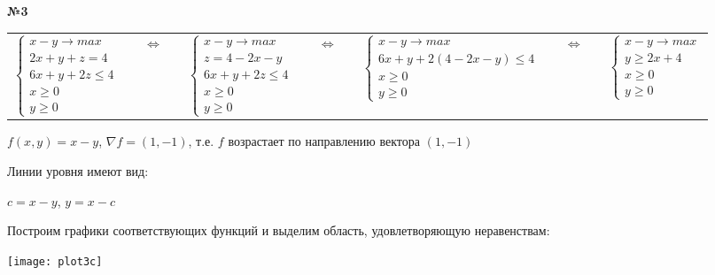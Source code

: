 \documentclass{article}
\newenvironment{task}{\begin{center}\fontsize{14}{14}\selectfont\bf}{\rm\fontsize{12}{12}\selectfont\end{center}}
\begin{document}

	\begin{task} 
		№3
	\end{task}
	\begin{center}
		\begin{tabular}{ccccccc}
			$ \begin{cases}
			x-y \rightarrow max \\
			2x+y+z=4 \\
			6x+y+2z \leq 4 \\
			x \geq 0 \\
			y \geq 0
			\end{cases} $
			& $\quad \Leftrightarrow \quad$ &
			$ \begin{cases}
			x-y \rightarrow max \\
			z=4-2x-y \\
			6x+y+2z \leq 4 \\
			x \geq 0 \\
			y \geq 0 
			\end{cases} $
			& $\quad \Leftrightarrow \quad$ &
			$ \begin{cases}
			x-y \rightarrow max \\
			6x+y+2(4-2x-y) \leq 4 \\
			x \geq 0 \\
			y \geq 0
			\end{cases} $
			& $\quad \Leftrightarrow \quad$ &
			$ \begin{cases}
			x-y \rightarrow max \\
			y \geq 2x+4 \\
			x \geq 0 \\
			y \geq 0
			\end{cases} $
		\end{tabular}
	\end{center}
	\begin{center} 
		$f(x, y) = x - y$, $\nabla f = (1, -1)$, т.е. $f$ возрастает по направлению вектора $(1, -1)$  \\
	\end{center}
	Линии уровня имеют вид:
	\begin{center} 
		$c = x - y$, \quad $y = x - c$ \\
	\end{center}
	\newpage
	Построим графики соответствующих функций и выделим область, удовлетворяющую неравенствам: \\
	\begin{center} \texttt{[image: plot3c]} \end{center}
	
\end{document}
